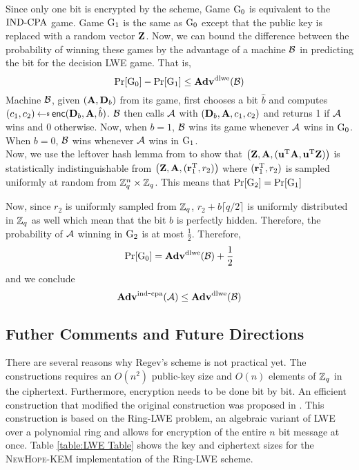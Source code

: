 \noindent Since only one bit is encrypted by the scheme, Game ${{\textnormal G}}_0$ is equivalent to the $\textnormal{IND-CPA}$ game. Game ${{\textnormal G}}_1$ is the same as ${{\textnormal G}}_0$ except that the public key is replaced with a random vector $\mathbf{Z}$. Now, we can bound the difference between the probability of winning these games by the advantage of a machine ${\mathcal B}$ in predicting the bit for the decision LWE game. That is,
\[
    \Pr[{{\textnormal G}}_0] - \Pr[{{\textnormal G}}_1] \leq \mathbf{Adv}^{\textnormal{dlwe}}({\mathcal B})
\]
Machine ${\mathcal B}$, given $(\mathbf{A}, \mathbf{D}_b)$ from its game, first chooses a bit $\hat{b}$ and computes $(c_1, c_2) \getsr \enc(\varvect{D}_b, \varvect{A}, \hat{b})$. ${\mathcal B}$ then calls ${\mathcal A}$ with $(\mathbf{D}_b, \mathbf{A}, c_1, c_2)$ and returns 1 if ${\mathcal A}$ wins and 0 otherwise. Now, when $b = 1$, ${\mathcal B}$ wins its game whenever ${\mathcal A}$ wins in ${{\textnormal G}}_0$. When $b = 0$, ${\mathcal B}$ wins whenever ${\mathcal A}$ wins in ${{\textnormal G}}_1$.\\

\noindent Now, we use the leftover hash lemma from to show that $\left( \mathbf{Z}, \mathbf{A}, (\mathbf{u}^{\textnormal{T}}\mathbf{A}, \mathbf{u}^{\textnormal{T}}\mathbf{Z}) \right)$ is statistically indistinguishable from $\left(\mathbf{Z}, \mathbf{A}, (\mathbf{r}_1^{\textnormal{T}}, r_2) \right)$ where $(\mathbf{r}_1^{\textnormal{T}}, r_2)$ is sampled uniformly at random from ${{\mathbb Z}}_q^n \times {{\mathbb Z}}_q$. This means that $\Pr[{{\textnormal G}}_2] = \Pr[{{\textnormal G}}_1]$

\noindent Now, since $r_2$ is uniformly sampled from ${{\mathbb Z}}_q$, $r_2 + b \lceil q/2 \rceil$ is uniformly distributed in ${{\mathbb Z}}_q$ as well which mean that the bit $b$ is perfectly hidden. Therefore, the probability of ${\mathcal A}$ winning in ${{\textnormal G}}_2$ is at most $\frac{1}{2}$. Therefore,
\[
    \Pr[{{\textnormal G}}_0] = \mathbf{Adv}^{\textnormal{dlwe}}({\mathcal B}) + \frac{1}{2}
\]
and we conclude
\[
    \mathbf{Adv}^{\mathrm{ind\mbox{-} cpa}}_{}({\mathcal A}) \leq \mathbf{Adv}^{\textnormal{dlwe}}({\mathcal B})
\]


\subsection{Futher Comments and Future Directions}
There are several reasons why Regev's scheme is not practical yet. The constructions requires an $O(n^2)$ public-key size and $O(n)$ elements of ${{\mathbb Z}}_q$ in the ciphertext. Furthermore, encryption needs to be done bit by bit. An efficient construction that modified the original construction was proposed in \cite{Lyubashevsky2010}. This construction is based on the Ring-LWE problem, an algebraic variant of LWE over a polynomial ring and allows for encryption of the entire $n$ bit message at once. Table \ref{table:LWE Table} shows the key and ciphertext sizes for the \textsc{NewHope-KEM} implementation of the Ring-LWE scheme.

